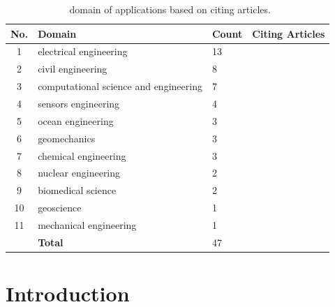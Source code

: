 \documentclass[11pt]{article}
\begin{document}
\begin{table}[!ht]
    \centering
    \caption{\uqlab~domain of applications based on citing articles.}
    \label{tab:citing_articles} 
    \begin{tabularx}{0.75\textwidth}{cllX}\toprule
      \textbf{No.} & \textbf{Domain} & \textbf{Count} & \textbf{Citing Articles}\\\midrule        
      1           & electrical engineering                 &  13 & \cite{Barbi2018,Ni2018,Larbi2018a,Larbi2018,Larbi2017,Li2017,Larbi2017a,Du2017a,Du2017,Ni2017,Acikgoz2016,Bilicz2016,Bdour2016}\\
      2           & civil engineering                      &   8 & \cite{Fengjie2018,Dutta2018,Hariri-Ardebili2018,Chen2017,Mylonas2017a,Mylonas2017,Sanctis2016,Abdallah2016}\\
      3           & computational science and engineering  &   7 & \cite{Cheng2018,Palar2018,Palar2018a,Kaintura2017,Hashemian2017,Abraham2017,Abraham2016}
      \\
      4           & sensors engineering                    &   4 & \cite{Yuzugullu2017,Erten2016,Erten2016a,Capellari2016}\\
      5           & ocean engineering                      &   3 & \cite{Colone2018,Gaspar2016a,Gaspar2016} \\
      6           & geomechanics                           &   3 & \cite{Toe2018,Toe2017,Mentani2016}\\
      7           & chemical engineering                   &   3 & \cite{Xie2018,Xie2017,Schenkendorf2017}\\
      8           & nuclear engineering                    &   2 & \cite{Turati2018,Wu2018a}\\
      9           & biomedical science                     &   2 & \cite{Chiaramello2017,Perko2016}\\      
      10          & geoscience                             &   1 & \cite{Hamdi2017}\\
      11          & mechanical engineering                 &   1 & \cite{Vohra2018}\\
                  & \textbf{Total}                         &  47 & \\\bottomrule
  \end{tabularx}
\end{table}

\section{Introduction}
\end{document}
